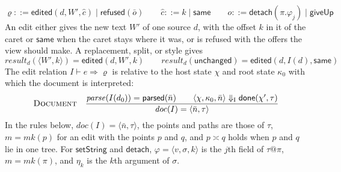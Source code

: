 \documentclass[11pt]{article}
\numberwithin{equation}{section}
\newcommand{\kw}[1]{\ensuremath{\mathsf{#1}}}
\newcommand{\rulelabel}[1]{\textsc{#1}}
\begin{document}
\begin{equation}\label{eq:edit-results}
\varrho ::= \kw{edited}(d, W', \hat c) \mid \kw{refused}(\bar o)
\qquad
\hat c ::= k \mid \kw{same}
\qquad
o ::= \kw{detach}(\pi.\varphi_j) \mid \kw{giveUp}
\end{equation}
An edit either gives the new text $W'$ of one source $d$, with the offset
$k$ in it of the caret or $\kw{same}$ when the caret stays where it was, or
is refused with the offers the view should make.  A replacement, split, or
style gives
\[
\mathit{result}_d(\langle W', k \rangle) = \kw{edited}(d, W', k)
\qquad
\mathit{result}_d(\kw{unchanged}) = \kw{edited}(d, I(d), \kw{same})
\]  The edit relation $I \vdash e
\Rightarrow \varrho$ is relative to the host state $\chi$ and root state
$\kappa_0$ with which the document is interpreted:
\begin{gather}
\rulelabel{Document}\quad
\frac{\mathit{parse}(I(d_0)) = \kw{parsed}(\bar n)
      \qquad \langle \chi, \kappa_0, \bar n \rangle \Downarrow_{\mathrm{I}}
        \kw{done}(\chi', \tau)}
     {\mathit{doc}(I) = \langle \bar n, \tau \rangle}
\end{gather}
In the rules below, $\mathit{doc}(I) = \langle \bar n, \tau \rangle$, the
points and paths are those of $\tau$, $m = \mathit{mk}(p)$ for an edit with
the points $p$ and $q$, and $p \asymp q$ holds when $p$ and $q$ lie in one
tree.  For $\kw{setString}$ and $\kw{detach}$, $\varphi = \langle v,
\sigma, k \rangle$ is the $j$th field of $\tau@\pi$, $m =
\mathit{mk}(\pi)$, and $\eta_k$ is the $k$th argument of $\sigma$.
\end{document}

